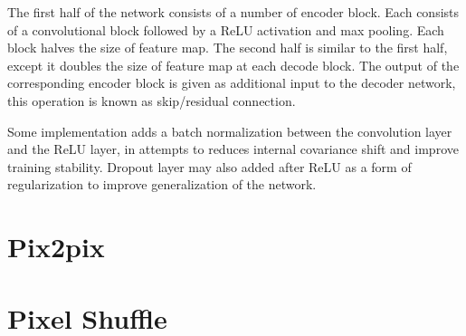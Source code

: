 The first half of the network consists of a number of encoder block. Each consists of a convolutional block followed by a ReLU activation and max pooling. Each block halves the size of feature map. The second half is similar to the first half, except it doubles the size of feature map at each decode block. The output of the corresponding encoder block is given as additional input to the decoder network, this operation is known as skip/residual connection.

Some implementation adds a batch normalization between the convolution layer and the ReLU layer, in attempts to reduces internal covariance shift and improve training stability. Dropout layer may also added after ReLU as a form of regularization to improve generalization of the network.

\section{Pix2pix}

\section{Pixel Shuffle}
